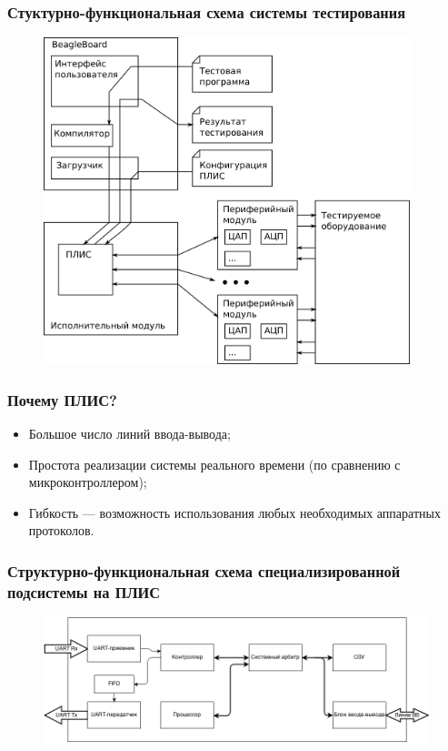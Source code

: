 \documentclass{beamer}
\begin{document}

\begin{frame}
\frametitle{Стуктурно-функциональная схема системы тестирования}
\begin{figure}
\includegraphics[width=0.95\textwidth,height=0.8\textheight,keepaspectratio]{arch.png}
\end{figure}
\end{frame}


\begin{frame}
\frametitle{Почему ПЛИС?}
\begin{itemize}
\item Большое число линий ввода-вывода;
\item Простота реализации системы реального времени (по сравнению с микроконтроллером);
\item Гибкость --- возможность использования любых необходимых аппаратных протоколов.
\end{itemize}
\end{frame}


\begin{frame}
\frametitle{Структурно-функциональная схема специализированной подсистемы на ПЛИС}
\begin{figure}
\includegraphics[width=0.95\linewidth]{system.png}
\end{figure}
\end{frame}
\end{document}
